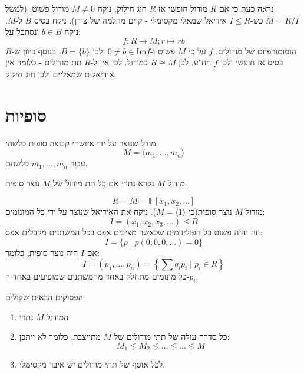 \documentclass{tstextbook}
\begin{document}
נראה כעת כי אם \(R\) מודול חופשי אז \(R\) חוג חילוק. ניקח \(M\neq 0\) מודול פשוט. (למשל \(M = R / I\) כש-\(I\leq R\) אידיאל שמאלי מקסימלי - קיים מהלמה של צורן).
ניקח בסיס \(B\) ל-\(M\). ניקח \(b\in B\) ונסתכל על:
$$f:R\to M; r\mapsto rb$$
הומומורפיזם של מודולים. \(f\) על כי \(M\) פשוט ו-\(0\neq b \in \mathrm{Im} f\) ולכן \(B=\{ b \}\). בנוסף כיוון ש-\(B\) בסיס אז חופשי ולכן \(f\) חח"ע. לכן \(R\cong M\) כמודול. לכן אין ל-\(R\) תת מודולים - כלומר אין אידיאלים שמאליים ולכן חוג חילוק.

\section{סופיות}

\begin{definition}
מודל שנוצר על ידי איזשהי קבוצה סופית כלשהי:
$$M=\langle m_{1},\dots,m_{n} \rangle $$
עבור \(m_{1},\dots ,m_{n}\) כלשהם.

\end{definition}
\begin{definition}
מודול \(M\) נקרא נתרי אם כל תת מודול של \(M\) נוצר סופית.

\end{definition}
\begin{example}
$$R=M=\mathbb{F} [x_{1},x_{2},\dots]$$
מודול \(M\) נוצר סופית(כי \(M=\langle 1 \rangle\)).
ניקח את האידיאל שנוצר על ידי כל המונומים:
$$I=(x_{1},x_{2},x_{3},\dots)\trianglelefteq  R$$
וזה יהיה פשוט כל הפולינומים שכאשר מציבים אפס בכל המשתנים מקבלים אפס:
$$I=\{ p\mid p(0,0,0,\dots)=0 \}$$
אם \(I\) היה נוצר סופית, כלומר:
$$I=(p_{1},\dots, p_{n})=\left\{  \sum q_{i}p_{i}\mid p_{i}\in R  \right\}$$
כל מונומים מתחלק באחד מהמשתנים שמופיעים באחד ה-\(p_{i}\).

\end{example}
\begin{proposition}
הפסוקים הבאים שקולים:

  \begin{enumerate}
    \item המודול \(M\) נתרי 


    \item כל סדרה עולה של תתי מודולים של \(M\) מתייצבת, כלומר לא ייתכן: 
$$M_{1} \lneq M_{2}\lneq \dots \lneq \dots \lneq M$$


    \item לכל אוסף של תתי מודולים יש איבר מקסימלי. 


  \end{enumerate}
\end{proposition}
\end{document}
